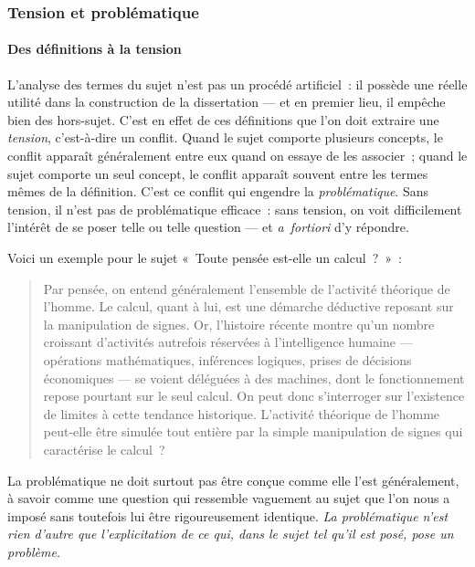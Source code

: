 \documentclass[a4paper,12pt]{article}
\begin{document}
\subsubsection{Tension et problématique}
\label{sec-2-2-2}

\paragraph{Des définitions à la tension}
\label{sec-2-2-2-1}

L'analyse des termes du sujet n'est pas un procédé artificiel : il
possède une réelle utilité dans la construction de la dissertation ---
et en premier lieu, il empêche bien des hors-sujet. C'est en effet de
ces définitions que l'on doit extraire une \emph{tension}, c'est-à-dire un
conflit. Quand le sujet comporte plusieurs concepts, le conflit apparaît
généralement entre eux quand on essaye de les associer ; quand le sujet
comporte un seul concept, le conflit apparaît souvent entre les termes
mêmes de la définition. C'est ce conflit qui engendre la
\emph{problématique}. Sans tension, il n'est pas de problématique efficace :
sans tension, on voit difficilement l'intérêt de se poser telle ou telle
question --- et \emph{a fortiori} d'y répondre.

Voici un exemple pour le sujet « Toute pensée est-elle un calcul ? » :

\begin{quote}
Par pensée, on entend généralement l'ensemble de l'activité théorique
de l'homme. Le calcul, quant à lui, est une démarche déductive
reposant sur la manipulation de signes. Or, l'histoire récente montre
qu'un nombre croissant d'activités autrefois réservées à
l'intelligence humaine --- opérations mathématiques, inférences
logiques, prises de décisions économiques --- se voient déléguées à
des machines, dont le fonctionnement repose pourtant sur le seul
calcul. On peut donc s'interroger sur l'existence de limites à cette
tendance historique. L'activité théorique de l'homme peut-elle être
simulée tout entière par la simple manipulation de signes qui
caractérise le calcul ?
\end{quote}

La problématique ne doit surtout pas être conçue comme elle l'est
généralement, à savoir comme une question qui ressemble vaguement au
sujet que l'on nous a imposé sans toutefois lui être rigoureusement
identique. \emph{La problématique n'est rien d'autre que l'explicitation de
ce qui, dans le sujet tel qu'il est posé, pose un problème.} 
\end{document}
